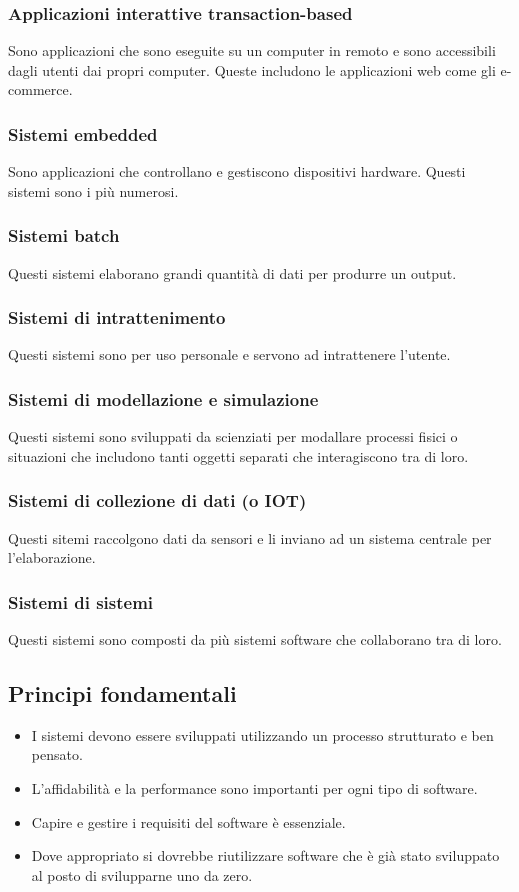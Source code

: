 \documentclass[a4paper]{article}
\begin{document}
\subsubsection{Applicazioni interattive transaction-based}
Sono applicazioni che sono eseguite su un computer in remoto e sono accessibili
dagli utenti dai propri computer. Queste includono le applicazioni web come
gli e-commerce.

\subsubsection{Sistemi embedded}
Sono applicazioni che controllano e gestiscono dispositivi hardware. Questi sistemi
sono i più numerosi.

\subsubsection{Sistemi batch}
Questi sistemi elaborano grandi quantità di dati per produrre un output.

\subsubsection{Sistemi di intrattenimento}
Questi sistemi sono per uso personale e servono ad intrattenere l'utente.

\subsubsection{Sistemi di modellazione e simulazione}
Questi sistemi sono sviluppati da scienziati per modallare processi fisici o situazioni
che includono tanti oggetti separati che interagiscono tra di loro.

\subsubsection{Sistemi di collezione di dati (o IOT)}
Questi sitemi raccolgono dati da sensori e li inviano ad un sistema centrale per
l'elaborazione.

\subsubsection{Sistemi di sistemi}
Questi sistemi sono composti da più sistemi software che collaborano tra di loro.

\subsection{Principi fondamentali}
\begin{itemize}
  \item I sistemi devono essere sviluppati utilizzando un processo strutturato e ben
    pensato.
  \item L'affidabilità e la performance sono importanti per ogni tipo di software.
  \item Capire e gestire i requisiti del software è essenziale.
  \item Dove appropriato si dovrebbe riutilizzare software che è già stato sviluppato
    al posto di svilupparne uno da zero.
\end{itemize}
\end{document}

